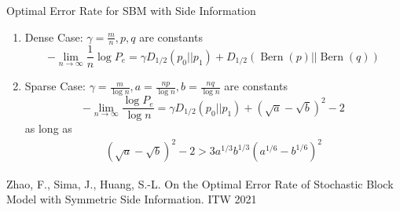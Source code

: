\documentclass[notheorems]{beamer}
\DeclareMathOperator{\Bern}{Bern}
\begin{document}
\begin{frame}{Optimal Error Rate for SBM with Side Information}
\begin{enumerate}
	\item Dense Case: $\gamma=\frac{m}{n}, p, q$ are constants
		\begin{equation*}
		-\lim_{n\to \infty} \frac{1}{n}\log P_e =  \gamma D_{1/2}(p_0 || p_1) + D_{1/2}(\Bern(p)||\Bern(q))
		\end{equation*}
	\item Sparse Case: $\gamma=\frac{m}{ \log n},
	a=\frac{np}{\log n}, b=\frac{nq}{\log n}$ are constants
		\begin{equation*}\label{eq:PeMainL}
		-\lim_{n\to \infty}\frac{\log P_e}{\log n}=\gamma D_{1/2}(p_0||p_1) + (\sqrt{a} - \sqrt{b})^2-2
		\end{equation*}
		as long as
		\begin{align*}
			(\sqrt{a}-\sqrt{b})^2-2 
			> 3a^{1/3}b^{1/3}(a^{1/6}-b^{1/6})^2\label{eq:oneC}
		\end{align*}	
\end{enumerate}
Zhao, F., Sima, J., Huang, S.-L. On the Optimal Error Rate of Stochastic Block Model with Symmetric Side Information.
ITW 2021
\end{frame}
\end{document}
